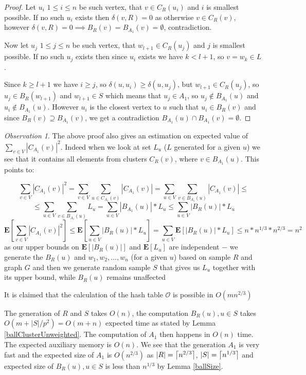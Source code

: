 \documentclass[shortabstract, lic, english]{iithesis}
\theoremstyle{definition} \newtheorem{definition}{Definition}[chapter]
\theoremstyle{remark} \newtheorem{remark}[definition]{Observation}
\theoremstyle{plain} \newtheorem{theorem}[definition]{Theorem}
\theoremstyle{plain} \newtheorem{lemma}[definition]{Lemma}
\theoremstyle{plain} \newtheorem{conjecture}[definition]{Conjecture}
\DeclarePairedDelimiter{\ceil}{\lceil}{\rceil}
\begin{document}
\begin{proof}
    Let $u_i$ $1 \leq i \leq n$ be such vertex, that $v \in C_R(u_i)$ and $i$ is smallest possible.
    If no such $u_i$ exists then $\delta(v, R) = 0$ as otherwise $v \in C_R(v)$, however $\delta(v, R) = 0 \implies B_R(v) = B_{A_1}(v) = \emptyset$, contradiction.

    Now let $u_j$ $1 \leq j \leq n$ be such vertex, that $w_{l+1} \in C_R(u_j)$ and $j$ is smallest possible. 
    If no such $u_j$ exists then since $u_i$ exists we have $k < l + 1$, so $v = w_k \in L$.

    Since $k \geq l + 1$ we have $i \geq j$, so $\delta(u, u_i) \geq \delta(u, u_j)$, but $w_{l+1} \in C_R(u_j)$, so $u_j \in B_R(w_{l+1})$ and $w_{l+1} \in S$
    which means that $u_j \in A_1$, so $u_j \notin B_{A_1}(u)$ and $u_i \notin B_{A_1}(u)$.
    However $u_i$ is the closest vertex to $u$ such that $u_i \in B_R(v)$ and since $B_R(v) \supseteq B_{A_1}(v)$, 
    we get a contradiction $B_{A_1}(u) \cap B_{A_1}(v) = \emptyset$.
\end{proof}

\begin{remark}
    The above proof also gives an estimation on expected value of $\sum_{v \in V}|C_{A_1}(v)|^2$.
    Indeed when we look at set $L_u$ ($L$ generated for a given $u$) we see that it contains all elements from clusters $C_R(v)$, where $v \in B_{A_1}(u)$.
    This points to:

    $$\sum_{v \in V}|C_{A_1}(v)|^2 = \sum_{v \in V}\sum_{u \in C_{A_1}(v)}|C_{A_1}(v)| = \sum_{u \in V}\sum_{v \in B_{A_1}(u)} |C_{A_1}(v)| \leq$$
    $$\leq \sum_{u \in V}\sum_{v \in B_{A_1}(u)} L_u = \sum_{u \in V} |B_{A_1}(u)| * L_u \leq \sum_{u \in V} |B_R(u)| * L_u$$
    $$\mathbf{E}[\sum_{v \in V}|C_{A_1}(v)|^2] \leq \mathbf{E}[\sum_{u \in V} |B_R(u)| * L_u] = \sum_{u \in V} \mathbf{E}[|B_R(u)| * L_u] \leq n * n^{1/3} * n^{2/3} = n^2$$
    as our upper bounds on $\mathbf{E}[|B_R(u)|]$ and $\mathbf{E}[L_u]$ are independent $-$ we generate the $B_R(u)$ and $w_1, w_2, \ldots, w_n$ (for a given $u$) based on sample $R$ and graph $G$
    and then we generate random sample $S$ that gives us $L_u$ together with its upper bound, while $B_R(u)$ remains unaffected
\end{remark}

It is claimed that the calculation of the hash table $\mathcal{O}$ is possible in $O(mn^{2/3})$ \cite{21OracleSpannerNoPenaltyNoLog}

The generation of $R$ and $S$ takes $O(n)$,
the computation $B_R(u), u \in S$ takes $O(m + |S|/p^2) = O(m + n)$ expected time as stated by Lemma \ref{ballClusterUnweighted}.
The computation of $A_1$ then happens in $O(n)$ time. The expected auxiliary memory is $O(n)$.
We see that the generation $A_1$ is very fast and the expected size of $A_1$ is $O(n^{2/3})$
as $|R| = \ceil[\big]{n^{2/3}}$, $|S| = \ceil[\big]{n^{1/3}}$ and expected size of $B_R(u), u \in S$ is less than $n^{1/3}$ by Lemma \ref{ballSize}.
\end{document}
